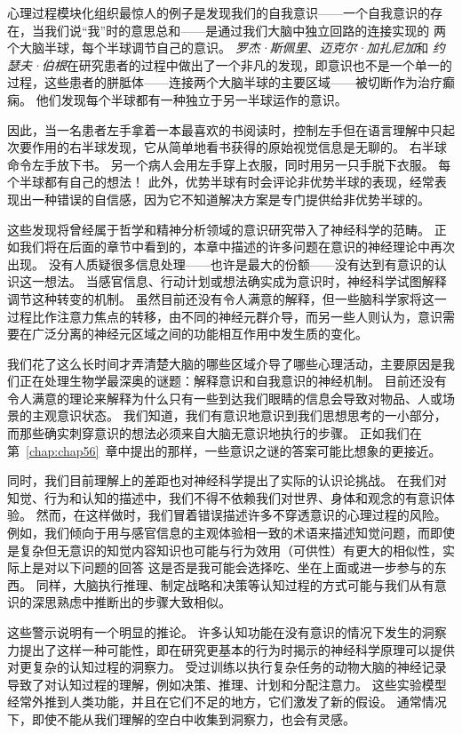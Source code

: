 心理过程模块化组织最惊人的例子是发现我们的自我意识——一个自我意识的存在，当我们说“我”时的意思总和——是通过我们大脑中独立回路的连接实现的 两个大脑半球，每个半球调节自己的意识。
\textit{罗杰·斯佩里}、\textit{迈克尔·加扎尼加}和 \textit{约瑟夫·伯根}在研究患者的过程中做出了一个非凡的发现，即意识也不是一个单一的过程，这些患者的胼胝体——连接两个大脑半球的主要区域——被切断作为治疗癫痫。
他们发现每个半球都有一种独立于另一半球运作的意识。


因此，当一名患者左手拿着一本最喜欢的书阅读时，控制左手但在语言理解中只起次要作用的右半球发现，它从简单地看书获得的原始视觉信息是无聊的。
右半球命令左手放下书。
另一个病人会用左手穿上衣服，同时用另一只手脱下衣服。 每个半球都有自己的想法！
此外，优势半球有时会评论非优势半球的表现，经常表现出一种错误的自信感，因为它不知道解决方案是专门提供给非优势半球的。


这些发现将曾经属于哲学和精神分析领域的意识研究带入了神经科学的范畴。
正如我们将在后面的章节中看到的，本章中描述的许多问题在意识的神经理论中再次出现。
没有人质疑很多信息处理——也许是最大的份额——没有达到有意识的认识这一想法。
当感官信息、行动计划或想法确实成为意识时，神经科学试图解释调节这种转变的机制。
虽然目前还没有令人满意的解释，但一些脑科学家将这一过程比作注意力焦点的转移，由不同的神经元群介导，而另一些人则认为，意识需要在广泛分离的神经元区域之间的功能相互作用中发生质的变化。


我们花了这么长时间才弄清楚大脑的哪些区域介导了哪些心理活动，主要原因是我们正在处理生物学最深奥的谜题：解释意识和自我意识的神经机制。
目前还没有令人满意的理论来解释为什么只有一些到达我们眼睛的信息会导致对物品、人或场景的主观意识状态。 
我们知道，我们有意识地意识到我们思想思考的一小部分，而那些确实刺穿意识的想法必须来自大脑无意识地执行的步骤。
正如我们在第~\ref{chap:chap56}~章中提出的那样，一些意识之谜的答案可能比想象的更接近。


同时，我们目前理解上的差距也对神经科学提出了实际的认识论挑战。
在我们对知觉、行为和认知的描述中，我们不得不依赖我们对世界、身体和观念的有意识体验。
然而，在这样做时，我们冒着错误描述许多不穿透意识的心理过程的风险。
例如，我们倾向于用与感官信息的主观体验相一致的术语来描述知觉问题，而即使是复杂但无意识的知觉内容知识也可能与行为效用（可供性）有更大的相似性，实际上是对以下问题的回答 这是否是我可能会选择吃、坐在上面或进一步参与的东西。
同样，大脑执行推理、制定战略和决策等认知过程的方式可能与我们从有意识的深思熟虑中推断出的步骤大致相似。


这些警示说明有一个明显的推论。
许多认知功能在没有意识的情况下发生的洞察力提出了这样一种可能性，即在研究更基本的行为时揭示的神经科学原理可以提供对更复杂的认知过程的洞察力。
受过训练以执行复杂任务的动物大脑的神经记录导致了对认知过程的理解，例如决策、推理、计划和分配注意力。 
这些实验模型经常外推到人类功能，并且在它们不足的地方，它们激发了新的假设。
通常情况下，即使不能从我们理解的空白中收集到洞察力，也会有灵感。


